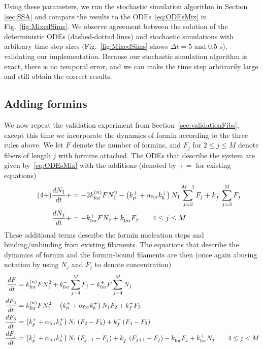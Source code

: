 \documentclass[11pt]{article}
\begin{document}
\begin{appendices}
Using these parameters, we run the stochastic simulation algorithm in Section \ref{sec:SSA} and compare the results to the ODEs\ \eqref{eq:ODEsMix} in Fig.\ \ref{fig:MixedSims}. We observe agreement between the solution of the deterministic ODEs (dashed-dotted lines) and stochastic simulations with arbitrary time step sizes (Fig.\ \ref{fig:MixedSims} shows $\Delta t=5$ and 0.5 s), validating our implementation. Because our stochastic simulation algorithm is exact, there is no temporal error, and we can make the time step arbitrarily large and still obtain the correct results.

\subsection{Adding formins}
We now repeat the validation experiment from Section\ \ref{sec:validationFibs}, except this time we incorporate the dynamics of formin according to the three rules above. We let $F$ denote the number of formins, and $F_j$ for $2 \leq j \leq M$ denote fibers of length $j$ with formins attached. The ODEs that describe the system are given by\ \eqref{eq:ODEsMix} with the additions (denoted by $+=$ for existing equations)
\begin{align*}
\label{eq:1plus}
\tag{4+}
\frac{d N_1}{dt} +&= -2k_\text{for}^{(n)} FN_1^2 - \left(k_p^+ +\alpha_\text{for} k_b^+\right)N_1 \sum_{j=2}^{M-1} F_j+k_f^- \sum_{j=3}^M  F_j\\
\frac{d N_j}{dt} +& = -k_\text{for}^+ F N_j + k_\text{for}^- F_j \qquad 4 \leq j \leq M
\end{align*}
These additional terms describe the formin nucleation steps and binding/unbinding from existing filaments. The equations that describe the dynamics of formin and the formin-bound filaments are then (once again abusing notation by using $N_j$ and $F_j$ to denote concentration)
\begin{subequations}
\label{eq:ODEsFormin}
\begin{align}
\frac{d F}{dt} &=\kforn F\Nm^2+\kform \sum_{j=4}^{M} F_j - \kforp F \sum_{j=4}^M N_j \\
\frac{d F_2}{dt} &= \kforn F\Nm^2 -\left(\kpp +\afor \kbp\right)N_1F_2 + \kfm F_3 \\
\frac{d F_3}{dt} &= \left(\kpp +\afor \kbp\right)N_1\left(F_2-F_3\right) + \kfm \left(F_4-F_3\right) \\
\frac{d F_j}{dt} & =\left(\kpp +\afor \kbp\right)N_1\left(F_{j-1}-F_j\right) + \kfm \left(F_{j+1}-F_j\right) - \kform F_j + \kforp N_j \qquad 4 \leq j < M \\

\end{align}
\end{subequations}
\end{appendices}
\end{document}
